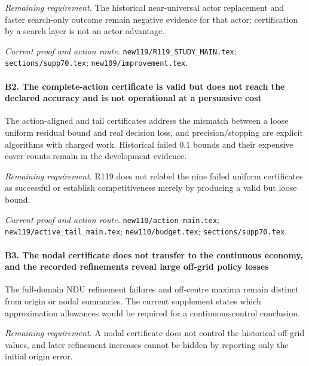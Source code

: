 \par\emph{Remaining requirement.} The historical near-universal actor replacement and faster search-only outcome remain negative evidence for that actor; certification by a search layer is not an actor advantage.

\par\emph{Current proof and action route.} \nolinkurl{new119/R119_STUDY_MAIN.tex}; \nolinkurl{sections/supp70.tex}; \nolinkurl{new109/improvement.tex}.

\paragraph{B2. The complete-action certificate is valid but does not reach the declared accuracy and is not operational at a persuasive cost}

The action-aligned and tail certificates address the mismatch between a loose uniform residual bound and real decision loss, and precision/\allowbreak{}stopping are explicit algorithms with charged work. Historical failed 0.1 bounds and their expensive cover counts remain in the development evidence.

\par\emph{Remaining requirement.} R119 does not relabel the nine failed uniform certificates as successful or establish competitiveness merely by producing a valid but loose bound.

\par\emph{Current proof and action route.} \nolinkurl{new110/action-main.tex}; \nolinkurl{new119/active_tail_main.tex}; \nolinkurl{new110/budget.tex}; \nolinkurl{sections/supp70.tex}.

\paragraph{B3. The nodal certificate does not transfer to the continuous economy, and the recorded refinements reveal large off-grid policy losses}

The full-domain NDU refinement failures and off-centre maxima remain distinct from origin or nodal summaries. The current supplement states which approximation allowances would be required for a continuous-control conclusion.

\par\emph{Remaining requirement.} A nodal certificate does not control the historical off-grid values, and later refinement increases cannot be hidden by reporting only the initial origin error.

